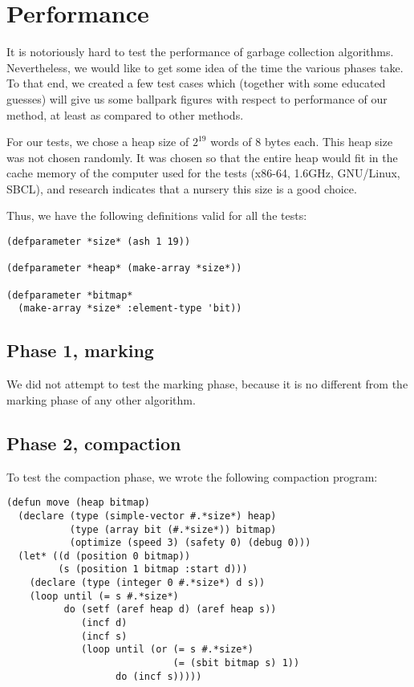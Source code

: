 \section{Performance}

It is notoriously hard to test the performance of garbage collection
algorithms.  Nevertheless, we would like to get some idea of the time
the various phases take.  To that end, we created a few test cases
which (together with some educated guesses) will give us some ballpark
figures with respect to performance of our method, at least as
compared to other methods. 

For our tests, we chose a heap size of $2^{19}$ words of $8$ bytes
each.  This heap size was not chosen randomly.  It was chosen so that
the entire heap would fit in the cache memory of the computer used for
the tests (x86-64, 1.6GHz, GNU/Linux, SBCL), and research
\cite{Marlow:2011:MGC:2076022.1993482} indicates that a nursery this
size is a good choice.

Thus, we have the following definitions valid for all the tests:

{\small\begin{verbatim}
(defparameter *size* (ash 1 19))

(defparameter *heap* (make-array *size*))

(defparameter *bitmap*
  (make-array *size* :element-type 'bit))
\end{verbatim}}


\subsection{Phase 1, marking}

We did not attempt to test the marking phase, because it is no
different from the marking phase of any other algorithm.

\subsection{Phase 2, compaction}

To test the compaction phase, we wrote the following compaction
program:

{\small\begin{verbatim}
(defun move (heap bitmap)
  (declare (type (simple-vector #.*size*) heap)
           (type (array bit (#.*size*)) bitmap)
           (optimize (speed 3) (safety 0) (debug 0)))
  (let* ((d (position 0 bitmap))
         (s (position 1 bitmap :start d)))
    (declare (type (integer 0 #.*size*) d s))
    (loop until (= s #.*size*)
          do (setf (aref heap d) (aref heap s))
             (incf d)
             (incf s)
             (loop until (or (= s #.*size*)
                             (= (sbit bitmap s) 1))
                   do (incf s)))))
\end{verbatim}}

